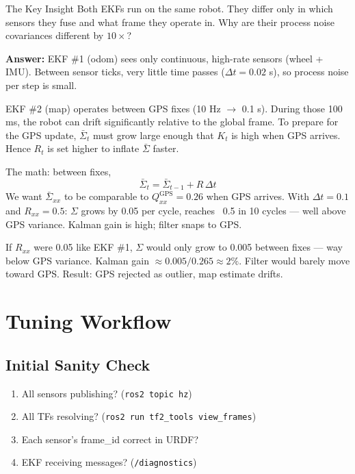 \documentclass[11pt,a4paper]{article}
\begin{document}
\begin{intuitionbox}{The Key Insight}
Both EKFs run on the same robot. They differ only in which sensors they fuse and what frame they operate in. Why are their process noise covariances different by $10\times$?

\textbf{Answer:} EKF \#1 (odom) sees only continuous, high-rate sensors (wheel + IMU). Between sensor ticks, very little time passes ($\Delta t = 0.02$ s), so process noise per step is small.

EKF \#2 (map) operates between GPS fixes (10 Hz $\to$ 0.1 s). During those 100 ms, the robot can drift significantly relative to the global frame. To prepare for the GPS update, $\bar{\Sigma}_t$ must grow large enough that $K_t$ is high when GPS arrives. Hence $R_t$ is set higher to inflate $\bar{\Sigma}$ faster.

The math: between fixes,
\[
\bar{\Sigma}_t = \bar{\Sigma}_{t-1} + R\, \Delta t
\]
We want $\bar{\Sigma}_{xx}$ to be comparable to $Q_{xx}^{\text{GPS}} = 0.26$ when GPS arrives. With $\Delta t = 0.1$ and $R_{xx} = 0.5$: $\Sigma$ grows by 0.05 per cycle, reaches ~0.5 in 10 cycles --- well above GPS variance. Kalman gain is high; filter snaps to GPS.

If $R_{xx}$ were 0.05 like EKF \#1, $\Sigma$ would only grow to 0.005 between fixes --- way below GPS variance. Kalman gain $\approx 0.005 / 0.265 \approx 2\%$. Filter would barely move toward GPS. Result: GPS rejected as outlier, map estimate drifts.
\end{intuitionbox}

\section{Tuning Workflow}

\subsection{Initial Sanity Check}

\begin{enumerate}
\item All sensors publishing? (\texttt{ros2 topic hz})
\item All TFs resolving? (\texttt{ros2 run tf2\_tools view\_frames})
\item Each sensor's frame\_id correct in URDF?
\item EKF receiving messages? (\texttt{/diagnostics})
\end{enumerate}
\end{document}
